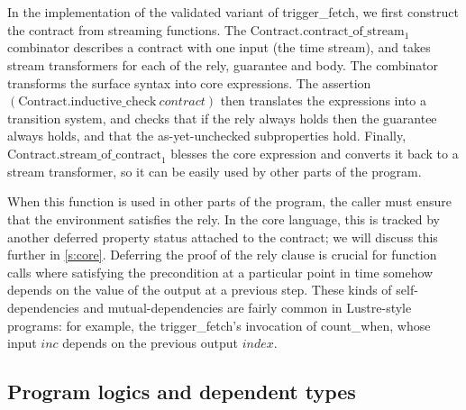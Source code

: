 In the implementation of the validated variant of trigger_fetch, we first construct the contract from streaming functions.
The $\text{Contract.contract_of_stream}_1$ combinator describes a contract with one input (the time stream), and takes stream transformers for each of the rely, guarantee and body.
The combinator transforms the surface syntax into core expressions.
The assertion $(\text{Contract.inductive_check}~\textit{contract})$ then translates the expressions into a transition system, and checks that if the rely always holds then the guarantee always holds, and that the as-yet-unchecked subproperties hold.
Finally, $\text{Contract.stream_of_contract}_1$ blesses the core expression and converts it back to a stream transformer, so it can be easily used by other parts of the program.

When this function is used in other parts of the program, the caller must ensure that the environment satisfies the rely.
In the core language, this is tracked by another deferred property status attached to the contract; we will discuss this further in \autoref{s:core}.
Deferring the proof of the rely clause is crucial for function calls where satisfying the precondition at a particular point in time somehow depends on the value of the output at a previous step.
These kinds of self-dependencies and mutual-dependencies are fairly common in Lustre-style programs: for example, the trigger_fetch's invocation of count_when, whose input $\textit{inc}$ depends on the previous output $\textit{index}$.



\subsection{Program logics and dependent types}



